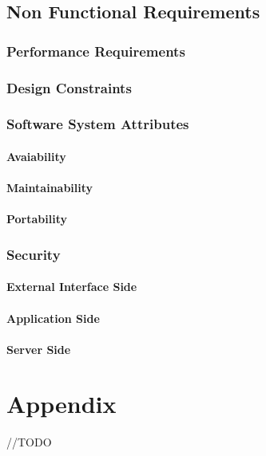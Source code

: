\documentclass{report}
\begin{document}
	\section{Non Functional Requirements}

		\subsection{Performance Requirements}

		\subsection{Design Constraints}

		\subsection{Software System Attributes}

			\subsubsection{Avaiability}

			\subsubsection{Maintainability}

			\subsubsection{Portability}

		\subsection{Security}

			\subsubsection{External Interface Side}

			\subsubsection{Application Side}

			\subsubsection{Server Side}


\chapter{Appendix}
//TODO
\end{document}
